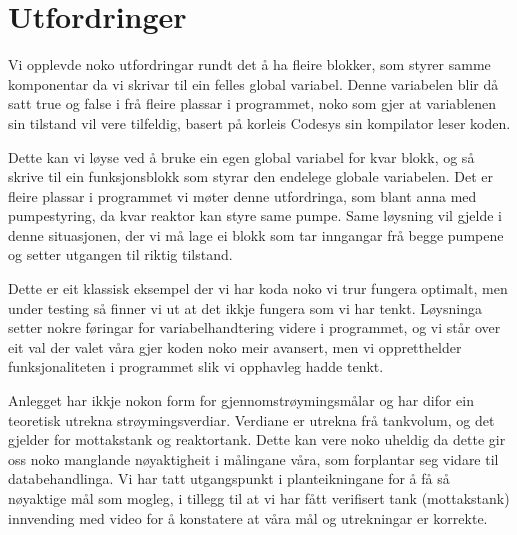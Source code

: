 \section{Utfordringer}
\thispagestyle{fancy}

Vi opplevde noko utfordringar rundt det å ha fleire blokker, som styrer samme komponentar da vi skrivar til ein felles global variabel.
Denne variabelen blir då satt true og false i frå fleire plassar i programmet, noko som gjer at variablenen sin tilstand vil vere tilfeldig, basert på korleis Codesys sin kompilator leser koden.

Dette kan vi løyse ved å bruke ein egen global variabel for kvar blokk, og så skrive til ein funksjonsblokk som styrar den endelege globale variabelen.
Det er fleire plassar i programmet vi møter denne utfordringa, som blant anna med pumpestyring, da kvar reaktor kan styre same pumpe.
Same løysning vil gjelde i denne situasjonen, der vi må lage ei blokk som tar inngangar frå begge pumpene og setter utgangen til riktig tilstand.  

Dette er eit klassisk eksempel der vi har koda noko vi trur fungera optimalt, men under testing så finner vi ut at det ikkje fungera som vi har tenkt.
Løysninga setter nokre føringar for variabelhandtering videre i programmet, og vi står over eit val der valet våra gjer koden noko meir avansert, men vi oppretthelder funksjonaliteten i programmet slik vi opphavleg hadde tenkt.


Anlegget har ikkje nokon form for gjennomstrøymingsmålar og har difor ein teoretisk utrekna strøymingsverdiar. 
Verdiane er utrekna frå tankvolum, og det gjelder for mottakstank og reaktortank. 
Dette kan vere noko uheldig da dette gir oss noko manglande nøyaktigheit i målingane våra, som forplantar seg vidare til databehandlinga.
Vi har tatt utgangspunkt i planteikningane for å få så nøyaktige mål som mogleg, i tillegg til at vi har fått verifisert tank (mottakstank) innvending med video for å konstatere at våra mål og utrekningar er korrekte.
